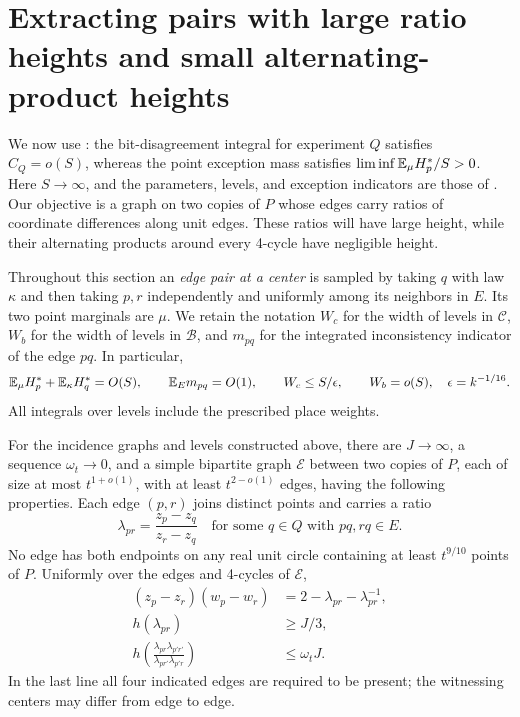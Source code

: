 \section{Extracting pairs with large ratio heights and small alternating-product heights}\label{sec:extraction}

We now use : the bit-disagreement integral for experiment $Q$ satisfies \(C_Q=o(S)\), whereas the point exception mass satisfies
\(\liminf \mathbb E_\mu H_p^*/S>0\).  Here \(S\to\infty\), and the parameters,
levels, and exception indicators are those of .
Our objective is a graph on two copies of \(P\) whose edges carry ratios of
coordinate differences along unit edges.  These ratios will have large height, while their alternating
products around every 4-cycle have negligible height.

Throughout this section an \emph{edge pair at a center} is sampled by taking
\(q\) with law \(\kappa\) and then taking \(p,r\) independently and uniformly
among its neighbors in \(E\).  Its two point marginals are \(\mu\).
We retain the notation \(W_c\) for the width of levels in $\mathcal C$, \(W_b\) for
the width of levels in $\mathcal B$, and \(m_{pq}\) for the integrated
inconsistency indicator of the edge \(pq\).  In particular,
\begin{equation}\label{ext:inputs}
 \mathbb E_\mu H_p^*+\mathbb E_\kappa H_q^*=O(S),\qquad
 \mathbb E_E m_{pq}=O(1),\qquad
 W_c\le S/\epsilon,\qquad W_b=o(S),
 \quad \epsilon=k^{-1/16}.
\end{equation}
All integrals over levels include the prescribed place weights.

\begin{proposition}\label{ext:pairs}
For the incidence graphs and levels constructed above, there are
\(J\to\infty\), a sequence \(\omega_t\to0\), and a simple bipartite graph
\(\mathcal E\) between two copies of \(P\), each of size at most
\(t^{1+o(1)}\), with at least \(t^{2-o(1)}\) edges, having the following
properties. Each edge \((p,r)\) joins distinct points and carries a ratio
\[
 \lambda_{pr}=\frac{z_p-z_q}{z_r-z_q}
       \quad\text{for some }q\in Q\text{ with }pq,rq\in E.
\]
No edge has both endpoints on any real unit circle containing at least
\(t^{9/10}\) points of \(P\).  Uniformly over the edges and 4-cycles of \(\mathcal E\),
\begin{align}
 (z_p-z_r)(w_p-w_r)&=2-\lambda_{pr}-\lambda_{pr}^{-1},
                                               \label{ext:pair-identity}\\
 h(\lambda_{pr})&\ge J/3,                      \label{ext:pair-height}\\
 h\!\left(\frac{\lambda_{pr}\lambda_{p'r'}}
                    {\lambda_{pr'}\lambda_{p'r}}\right)
 &\le\omega_tJ.                               \label{ext:rectangle-height}
\end{align}
In the last line all four indicated edges are required to be present;
the witnessing centers may differ from edge to edge.
\end{proposition}

